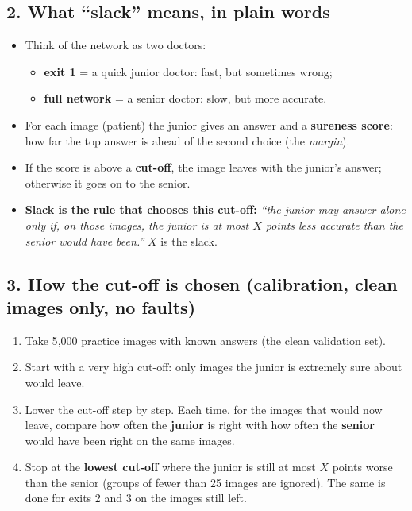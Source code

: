 \documentclass[10pt,a4paper]{article}
\begin{document}
\subsection*{2. What ``slack'' means, in plain words}

\begin{itemize}
  \item Think of the network as two doctors:
  \begin{itemize}
    \item \textbf{exit 1} = a quick junior doctor: fast, but sometimes wrong;
    \item \textbf{full network} = a senior doctor: slow, but more accurate.
  \end{itemize}
  \item For each image (patient) the junior gives an answer and a \textbf{sureness score}: how far the top answer is
        ahead of the second choice (the \emph{margin}).
  \item If the score is above a \textbf{cut-off}, the image leaves with the junior's answer; otherwise it goes on
        to the senior.
  \item \textbf{Slack is the rule that chooses this cut-off:} \emph{``the junior may answer alone only if, on those
        images, the junior is at most $X$ points less accurate than the senior would have been.''} $X$ is the slack.
\end{itemize}

\subsection*{3. How the cut-off is chosen (calibration, clean images only, no faults)}

\begin{enumerate}
  \item Take 5{,}000 practice images with known answers (the clean validation set).
  \item Start with a very high cut-off: only images the junior is extremely sure about would leave.
  \item Lower the cut-off step by step. Each time, for the images that would now leave, compare
        how often the \textbf{junior} is right with how often the \textbf{senior} would have been right on the same images.
  \item Stop at the \textbf{lowest cut-off} where the junior is still at most $X$ points worse than the senior
        (groups of fewer than 25 images are ignored). The same is done for exits 2 and 3 on the images still left.
\end{enumerate}
\end{document}
